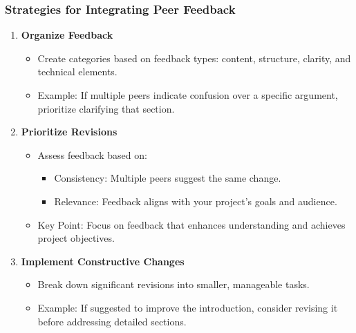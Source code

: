 \documentclass[aspectratio=169]{beamer}
\begin{document}
\begin{frame}[fragile]
    \frametitle{Strategies for Integrating Peer Feedback}
    \begin{enumerate}
        \item \textbf{Organize Feedback}
            \begin{itemize}
                \item Create categories based on feedback types: content, structure, clarity, and technical elements.
                \item Example: If multiple peers indicate confusion over a specific argument, prioritize clarifying that section.
            \end{itemize}

        \item \textbf{Prioritize Revisions}
            \begin{itemize}
                \item Assess feedback based on:
                    \begin{itemize}
                        \item Consistency: Multiple peers suggest the same change.
                        \item Relevance: Feedback aligns with your project's goals and audience.
                    \end{itemize}
                \item Key Point: Focus on feedback that enhances understanding and achieves project objectives.
            \end{itemize}

        \item \textbf{Implement Constructive Changes}
            \begin{itemize}
                \item Break down significant revisions into smaller, manageable tasks.
                \item Example: If suggested to improve the introduction, consider revising it before addressing detailed sections.
            \end{itemize}
    \end{enumerate}
\end{frame}
\end{document}
